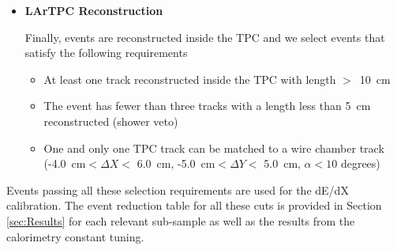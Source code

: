 \begin{itemize}
\item \textbf{LArTPC Reconstruction}

Finally, events are reconstructed inside the TPC and we select events that satisfy the following requirements

\begin{itemize}
\item At least one track reconstructed inside the TPC with length $>$~10~cm
\item The event has fewer than three tracks with a length less than 5~cm reconstructed (shower veto)
\item One and only one TPC track can be matched to a wire chamber track (-4.0~cm$< \Delta X <$ 6.0~cm, -5.0~cm$< \Delta Y <$ 5.0~cm, $\alpha < 10$ degrees)

\end{itemize}


\end{itemize}

Events passing all these selection requirements are used for the dE/dX calibration. The event reduction table for all these cuts is provided in Section \ref{sec:Results} for each relevant sub-sample as well as the results from the calorimetry constant tuning.
